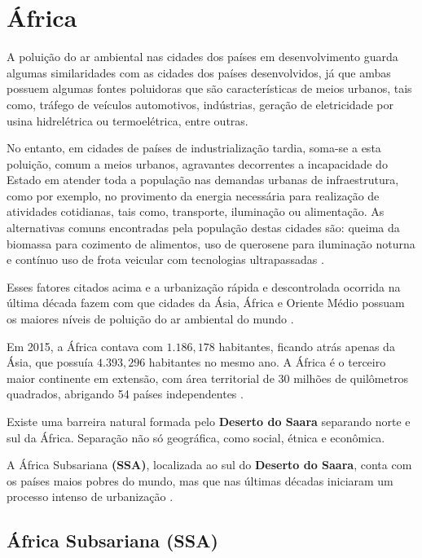 \section{África}

A poluição do ar ambiental nas cidades dos países em desenvolvimento
guarda algumas similaridades com as cidades dos países desenvolvidos, já que 
ambas possuem algumas fontes poluidoras que são características de meios urbanos, 
tais como, tráfego de veículos automotivos, indústrias, geração de 
eletricidade por usina hidrelétrica ou termoelétrica, entre outras. 

No entanto, em cidades de países de industrialização tardia, soma-se a esta 
poluição, comum a meios urbanos, agravantes decorrentes a incapacidade do 
Estado em atender toda a população nas demandas urbanas de infraestrutura, 
como por exemplo, no provimento da energia necessária para realização de 
atividades cotidianas, tais como, transporte, iluminação ou alimentação. 
As alternativas comuns encontradas pela população destas cidades são: queima da 
biomassa para cozimento de alimentos, uso de querosene para iluminação 
noturna e contínuo uso de frota veicular com tecnologias ultrapassadas
\citep{brauer2012}.

Esses fatores citados acima e a urbanização rápida e descontrolada ocorrida na
última década fazem com que cidades da Ásia, África e Oriente 
Médio possuam os maiores níveis de poluição do ar ambiental do mundo 
\citep{brauer2012}.

Em 2015, a África contava com $1.186,178$ habitantes, ficando atrás 
apenas da Ásia, que possuía $4.393,296$ habitantes no mesmo ano. 
A África é o terceiro maior continente em extensão, com área territorial 
de 30 milhões de quilômetros quadrados, abrigando 54 países independentes 
\citep{UN}.

Existe uma barreira natural formada pelo \textbf{Deserto do Saara}
separando norte e sul da África. Separação não só geográfica, como
social, étnica e econômica. 

A África Subsariana \textbf{(SSA)}, localizada ao sul do 
\textbf{Deserto do Saara}, conta com os países maios pobres do mundo, mas que 
nas últimas décadas iniciaram um processo intenso de urbanização \citep{UN}. 
   	
\subsection{África Subsariana \textbf{(SSA)}}

